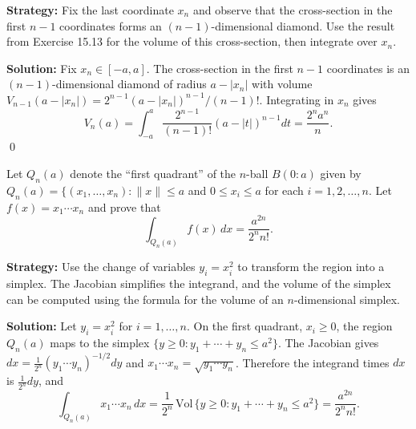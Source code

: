 \noindent\textbf{Strategy:} Fix the last coordinate \(x_n\) and observe that the cross-section in the first \(n-1\) coordinates forms an \((n-1)\)-dimensional diamond. Use the result from Exercise 15.13 for the volume of this cross-section, then integrate over \(x_n\).

\bigskip\noindent\textbf{Solution:}
Fix \(x_n\in[-a,a]\). The cross-section in the first \(n-1\) coordinates is an \((n-1)\)-dimensional diamond of radius \(a-|x_n|\) with volume \(V_{n-1}(a-|x_n|)=2^{n-1}(a-|x_n|)^{n-1}/(n-1)!\). Integrating in \(x_n\) gives
\[
V_n(a)=\int_{-a}^{a} \frac{2^{n-1}}{(n-1)!} (a-|t|)^{n-1} dt = \frac{2^n a^n}{n}.
\]\qed


\begin{problembox}
Let \( Q_n(a) \) denote the ``first quadrant'' of the \( n \)-ball \( B(0:a) \) given by
$Q_n(a) = \{(x_1, \ldots, x_n): \|x\| \leq a$ and $ 0 \leq x_i \leq a $ for each $ i = 1, 2, \ldots, n.$
Let \( f(x) = x_1 \cdots x_n \) and prove that
\[
\int_{Q_n(a)} f(x) \, dx = \frac{a^{2n}}{2^n n!}.
\]
\end{problembox}

\noindent\textbf{Strategy:} Use the change of variables \(y_i = x_i^2\) to transform the region into a simplex. The Jacobian simplifies the integrand, and the volume of the simplex can be computed using the formula for the volume of an \(n\)-dimensional simplex.

\bigskip\noindent\textbf{Solution:}
Let \(y_i=x_i^2\) for \(i=1,\ldots,n\). On the first quadrant, \(x_i\ge 0\), the region \(Q_n(a)\) maps to the simplex \(\{y\ge 0: y_1+\cdots+y_n\le a^2\}\). The Jacobian gives \(dx=\frac{1}{2^n}(y_1\cdots y_n)^{-1/2}dy\) and \(x_1\cdots x_n=\sqrt{y_1\cdots y_n}\). Therefore the integrand times \(dx\) is \(\frac{1}{2^n} dy\), and
\[
\int_{Q_n(a)} x_1\cdots x_n\,dx = \frac{1}{2^n}\,\mathrm{Vol}\,\{y\ge 0: y_1+\cdots+y_n\le a^2\} = \frac{a^{2n}}{2^n n!}.
\]